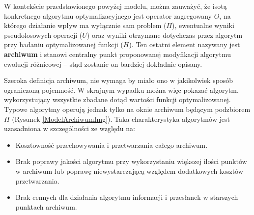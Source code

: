 \documentclass[11pt,a4paper]{report}
\begin{document}
{\par{
W kontekście przedstawionego powyżej modelu, można zauważyć, że isotą konkretnego algorytmu optymalizacyjnego jest operator zagregowany $O$, na którego działanie wpływ ma wyłącznie sam problem ($\Pi$), ewentualne wyniki pseudolosowych operacji ($U$) oraz wyniki otrzymane dotychczas przez algorytm przy badaniu optymalizowanej funkcji ($H$). Ten ostatni element nazywany jest \textbf{archiwum} i stanowi centralny punkt proponowanej modyfikacji algorytmu ewolucji różnicowej -- stąd zostanie on bardziej dokładnie opisany.
}
\par{
Szeroka definicja archiwum, nie wymaga by miało ono w jakikolwiek sposób ograniczoną pojemność. W skrajnym wypadku można więc pokazać algorytm, wykorzystujący wszystkie zbadane dotąd wartości funkcji optymalizowanej. Typowe algorytmy operują jednak tylko na oknie archiwum będącym podzbiorem $H$ (Rysunek \ref{ModelArchiwumImg}). Taka charakterystyka algorytmów jest uzasadniona w szczególności ze względu na:
\par{
\begin{itemize}
\item Kosztowność przechowywania i przetwarzania całego archiwum.
\item Brak poprawy jakości algorytmu przy wykorzystaniu większej ilości punktów w archiwum lub poprawę niewystarczającą względem dodatkowych kosztów przetwarzania.
\item Brak cennych dla działania algorytmu informacji i przesłanek w starszych punktach archiwum.
\end{itemize}
}
\begin{figure}[htb]

\end{figure}}}
\end{document}
